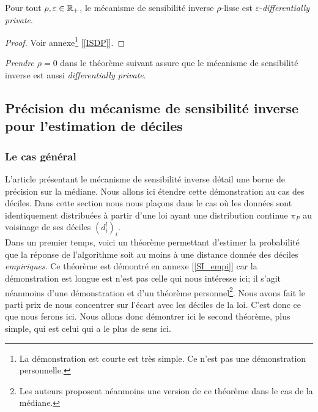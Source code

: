\begin{theorem}
    Pour tout \(\rho,\varepsilon \in \mathbb{R}_+\), le mécanisme de sensibilité inverse \(\rho\)-lisse est \(\varepsilon\)-\textit{differentially private}.
\end{theorem}


\begin{proof}
    Voir annexe\footnote{La démonstration est courte est très simple. Ce n'est pas une démonstration personnelle.} [\ref{ISDP}].
\end{proof}


\begin{remark}
    \textit{Prendre \(\rho = 0\)} dans le théorème suivant assure que le mécanisme de sensibilité inverse est aussi \textit{differentially private}.
\end{remark}

\subsection{Précision du mécanisme de sensibilité inverse pour l'estimation de déciles}

\subsubsection{Le cas général}

L'article présentant le mécanisme de sensibilité inverse \cite{Asi2020NearII} détail une borne de précision sur la médiane. Nous allons ici étendre cette démonstration au cas des déciles. Dans cette section nous nous plaçons dans le cas où les données sont identiquement distribuées à partir d'une loi ayant une distribution continue \(\pi_P\) au voisinage de ses déciles \((d_i^l)_i\).\\

Dans un premier temps, voici un théorème permettant d'estimer la probabilité que la réponse de l'algorithme soit au moins à une distance donnée des déciles \textit{empiriques}. Ce théorème est démontré en annexe [\ref{SI_empi}] car la démonstration est longue est n'est pas celle qui nous intéresse ici; il s'agit néanmoins d'une démonstration et d'un théorème personnel\footnote{Les auteurs proposent néanmoins une version de ce théorème dans le cas de la médiane.}. Nous avons fait le parti prix de nous concentrer sur l'écart avec les déciles de la loi. C'est donc ce que nous ferons ici. Nous allons donc démontrer ici le second théorème, plus simple, qui est celui qui a le plus de sens ici. \\


